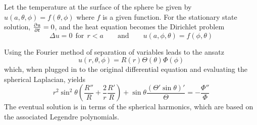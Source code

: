 \documentclass[11pt, a4paper]{article}
\begin{document}
Let the temperature at the surface of the sphere be given by $ u(a, \theta, \phi) = f(\theta, \phi) $ where $ f $ is a given function. For the stationary state solution, $ \pdv{u}{t} = 0$, and the heat equation becomes the Dirichlet problem
\begin{equation*}
	\Delta u = 0 \ \ \text{for} \ \ r < a \qquad \text{and} \qquad u(a, \phi, \theta) = f(\phi, \theta)
\end{equation*}

Using the Fourier method of separation of variables leads to the ansatz 
\begin{equation*}
	u(r, \theta, \phi) = R(r) \Theta(\theta) \Phi(\phi)
\end{equation*}
which, when plugged in to the original differential equation and evaluating the spherical Laplacian, yields
\begin{equation*}
	r^2 \sin^2 \theta \left(\frac{R''}{R} + \frac{2}{r} \frac{R'}{R}\right) + \sin \theta \frac{(\Theta'\sin\theta)'}{\Theta} = - \frac{\Phi''}{\Phi}
\end{equation*}
The eventual solution is in terms of the spherical harmonics, which are based on the associated Legendre polynomials.
\end{document}
